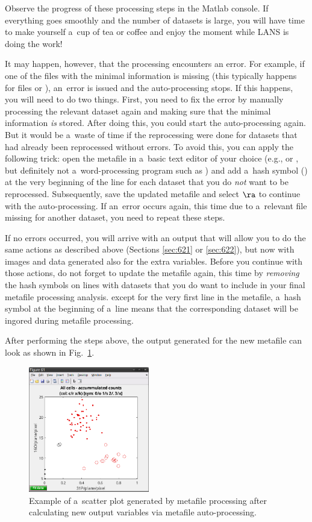 \bul Observe the progress of these processing steps in the Matlab console. If everything goes smoothly and the number of datasets is large, you will have time to make yourself a~cup of tea or coffee and enjoy the moment while LANS is doing the work! 

\bul It may happen, however, that the processing encounters an error. For example, if one of the files with the minimal information is missing (this typically happens for files  or ), an~error is issued and the auto-processing stops. If this happens, you will need to do two things. First, you need to fix the error by manually processing the relevant dataset again and making sure that the minimal information \emph{is} stored. After doing this, you could start the auto-processing again. But it would be a~waste of time if the reprocessing were done for datasets that had already been reprocessed without errors. To avoid this, you can apply the following trick: open the metafile in a~basic text editor of your choice (e.g.,  or , but definitely not a~word-processing program such as ) and add a~hash symbol (\ttt{\#}) at the very beginning of the line for each dataset that you do \emph{not} want to be reprocessed. Subsequently, save the updated metafile and select  $\ra$  to continue with the auto-processing. If an~error occurs again, this time due to a~relevant file missing for another dataset, you need to repeat these steps.

\bul If no errors occurred, you will arrive with an output that will allow you to do the same actions as described above (Sections \ref{sec:621} or \ref{sec:622}), but now with images and data generated also for the extra variables. Before you continue with those actions, do not forget to update the metafile again, this time by \emph{removing} the hash symbols on lines with datasets that you do want to include in your final metafile processing analysis.  except for the very first line in the metafile, a~hash symbol at the beginning of a~line means that the corresponding dataset will be ingored during metafile processing.

\bul After performing the steps above, the output generated for the new metafile  can look as shown in Fig.~\ref{fig:metafile-scatterplot2}.

\begin{figure}[!ht]
\centering
\includegraphics[width=0.47\textwidth]{figs3/LANS-metafile-scatterplot3}
\caption{\label{fig:metafile-scatterplot2}%
Example of a~scatter plot generated by metafile processing after calculating new output variables via metafile auto-processing.}
\end{figure}
